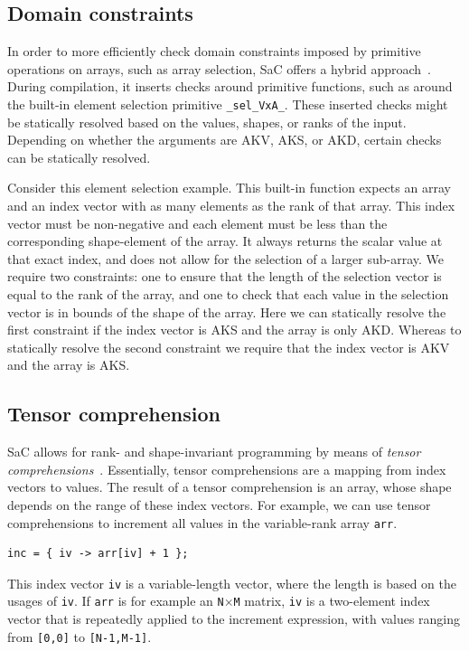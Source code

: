 \documentclass[sigconf,screen]{acmart}
\begin{document}
\subsection{Domain constraints}
In order to more efficiently check domain constraints imposed by primitive operations on arrays, such as array selection, SaC offers a hybrid approach~\cite{sac-contracts}.
During compilation, it inserts checks around primitive functions, such as around the built-in element selection primitive \verb|_sel_VxA_|.
These inserted checks might be statically resolved based on the values, shapes, or ranks of the input.
Depending on whether the arguments are AKV, AKS, or AKD, certain checks can be statically resolved.

Consider this element selection example.
This built-in function expects an array and an index vector with as many elements as the rank of that array.
This index vector must be non-negative and each element must be less than the corresponding shape-element of the array.
It always returns the scalar value at that exact index, and does not allow for the selection of a larger sub-array.
We require two constraints: one to ensure that the length of the selection vector is equal to the rank of the array, and one to check that each value in the selection vector is in bounds of the shape of the array.
Here we can statically resolve the first constraint if the index vector is AKS and the array is only AKD.
Whereas to statically resolve the second constraint we require that the index vector is AKV and the array is AKS.

\subsection{Tensor comprehension}
SaC allows for rank- and shape-invariant programming by means of \emph{tensor comprehensions}~\cite{sac-tensor}.
Essentially, tensor comprehensions are a mapping from index vectors to values.
The result of a tensor comprehension is an array, whose shape depends on the range of these index vectors.
For example, we can use tensor comprehensions to increment all values in the variable-rank array \texttt{arr}.

\begin{lstlisting}
inc = { iv -> arr[iv] + 1 };
\end{lstlisting}

This index vector \texttt{iv} is a variable-length vector, where the length is based on the usages of \texttt{iv}.
If \texttt{arr} is for example an \texttt{N$\times$M} matrix, \texttt{iv} is a two-element index vector that is repeatedly applied to the increment expression, with values ranging from \texttt{[0,0]} to \texttt{[N-1,M-1]}.
\end{document}

